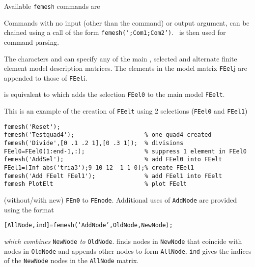 \noindent Available {\tt femesh} commands are


 Commands with no input (other than the command) or output argument, can be chained using a call of the form {\tt femesh(';Com1;Com2')}. \commode\ is then used for command parsing.


 The characters  and  can specify any of the main , selected  and alternate  finite element model description matrices.  The elements in the model matrix {\tt FEel}{\ti j} are appended to those of {\tt FEel}{\ti i}.

\noindent{} is equivalent to  which adds the selection {\tt FEel0} to the main model {\tt FEelt}.

This is an example of the creation of {\tt FEelt} using 2 selections ({\tt FEel0} and {\tt FEel1}) 

\begin{verbatim}
femesh('Reset');
femesh('Testquad4');                    % one quad4 created
femesh('Divide',[0 .1 .2 1],[0 .3 1]);  % divisions
FEel0=FEel0(1:end-1,:);                 % suppress 1 element in FEel0
femesh('AddSel');                       % add FEel0 into FEelt
FEel1=[Inf abs('tria3');9 10 12  1 1 0];% create FEel1 
femesh('Add FEelt FEel1');              % add FEel1 into FEelt
femesh PlotElt                          % plot FEelt
\end{verbatim}%



(without/with new) {\tt FEn0} to {\tt FEnode}.  Additional uses of {\tt AddNode} are provided using the format

{\tt [AllNode,ind]=femesh('AddNode',OldNode,NewNode);}

{\sl which combines} {\tt NewNode} {\sl to} {\tt OldNode}.  
 finds nodes in {\tt NewNode} that coincide with nodes in {\tt OldNode} and appends other nodes to form {\tt AllNode}.  {\tt ind} gives the indices of the {\tt NewNode} nodes in the {\tt AllNode} matrix.

